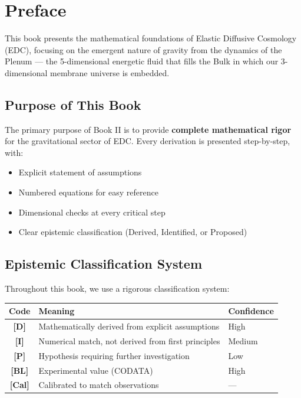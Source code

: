 \documentclass[12pt,a4paper,openany]{book}
\theoremstyle{definition}
\theoremstyle{plain}
\theoremstyle{remark}
\newcommand{\derived}{\textcolor{derivedcolor}{\textbf{[D]}}}
\newcommand{\identified}{\textcolor{identifiedcolor}{\textbf{[I]}}}
\newcommand{\proposed}{\textcolor{proposedcolor}{\textbf{[P]}}}
\newcommand{\baseline}{\textcolor{edcgray}{\textbf{[BL]}}}
\newcommand{\calibrated}{\textcolor{edcgray}{\textbf{[Cal]}}}
\begin{document}
\tableofcontents

\chapter*{Preface}

This book presents the mathematical foundations of Elastic Diffusive Cosmology (EDC), focusing on the emergent nature of gravity from the dynamics of the Plenum — the 5-dimensional energetic fluid that fills the Bulk in which our 3-dimensional membrane universe is embedded.

\section*{Purpose of This Book}

The primary purpose of Book II is to provide \textbf{complete mathematical rigor} for the gravitational sector of EDC. Every derivation is presented step-by-step, with:
\begin{itemize}
    \item Explicit statement of assumptions
    \item Numbered equations for easy reference
    \item Dimensional checks at every critical step
    \item Clear epistemic classification (Derived, Identified, or Proposed)
\end{itemize}

\section*{Epistemic Classification System}

Throughout this book, we use a rigorous classification system:

\begin{center}
\begin{tabular}{|c|l|l|}
\hline
\textbf{Code} & \textbf{Meaning} & \textbf{Confidence} \\
\hline
\derived & Mathematically derived from explicit assumptions & High \\
\identified & Numerical match, not derived from first principles & Medium \\
\proposed & Hypothesis requiring further investigation & Low \\
\baseline & Experimental value (CODATA) & High \\
\calibrated & Calibrated to match observations & — \\
\hline
\end{tabular}
\end{center}
\end{document}
